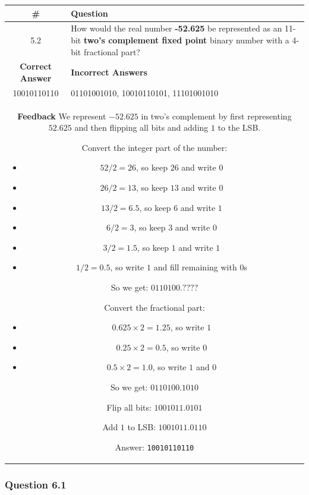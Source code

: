 \begin{tabular}{|c|p{12cm}|}
\hline
\# & Question \\
\hline
5.2 & How would the real number \textbf{-52.625} be represented as an 11-bit \textbf{two's complement fixed point} binary number with a 4-bit fractional part? \\
\hline
\textbf{Correct Answer} & \textbf{Incorrect Answers} \\
10010110110 & 01101001010, 10010110101, 11101001010 \\
\hline
\multicolumn{2}{|p{14cm}|}{
\textbf{Feedback} \newline
We represent $-52.625$ in two's complement by first representing $52.625$ and then flipping all bits and adding $1$ to the LSB.

Convert the integer part of the number:
\begin{itemize}
\item $52 / 2 = 26$, so keep $26$ and write $0$
\item $26 / 2 = 13$, so keep $13$ and write $0$
\item $13 / 2 = 6.5$, so keep $6$ and write $1$
\item $6 / 2 = 3$, so keep $3$ and write $0$
\item $3 / 2 = 1.5$, so keep $1$ and write $1$
\item $1 / 2 = 0.5$, so write $1$ and fill remaining with $0$s
\end{itemize}
So we get: $0110100.????$

Convert the fractional part:
\begin{itemize}
\item $0.625 \times 2 = 1.25$, so write $1$
\item $0.25 \times 2 = 0.5$, so write $0$
\item $0.5 \times 2 = 1.0$, so write $1$ and $0$
\end{itemize}
So we get: $0110100.1010$

Flip all bits: $1001011.0101$

Add $1$ to LSB: $1001011.0110$

Answer: \texttt{10010110110}
} \\
\hline
\end{tabular}
\newline

\subsubsection{Question 6.1}

